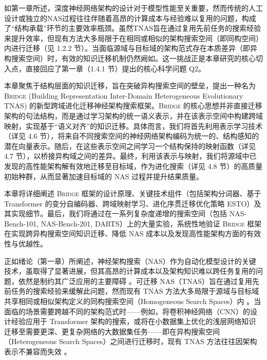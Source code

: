\documentclass[../main.tex]{subfiles}
\begin{document}


如第一章所述，深度神经网络架构的设计对于模型性能至关重要，然而传统的人工设计或独立的NAS过程往往伴随着高昂的计算成本与经验难以复用的问题，构成了“结构承载”环节的主要效率瓶颈。虽然TNAS旨在通过复用先前任务的搜索经验来提升效率，但现有方法大多局限于在相同或相似的架构搜索空间（即同构空间）内进行迁移（见 1.2.2 节）。当面临源域与目标域的架构范式存在本质差异（即异构搜索空间）时，有效的知识迁移机制仍然阙如。这一挑战正是本章研究的核心切入点，直接回应了第一章（1.4.1 节）提出的核心科学问题 Q2。

本章聚焦于结构层面的知识迁移，旨在突破异构搜索空间的壁垒，提出一种名为 \textsc{Bridge} (Building Representation Inter-Domain Heterogeneous Evolutionary TNAS) 的新型跨域进化迁移神经架构搜索框架。\textsc{Bridge} 的核心思想并非直接迁移架构的句法结构，而是通过学习架构的统一语义表示，并在该表示空间中构建跨域映射，实现基于“语义对齐”的知识迁移。具体而言，我们将首先利用表示学习技术（详见 4.6 节），将来自不同搜索空间的神经网络架构编码为统一的、结构感知的潜在向量表示。随后，在这些表示空间之间学习一个结构保持的映射函数（详见 4.7 节），以桥接异构域之间的差异。最终，利用该表示与映射，我们将源域中已发现的高性能架构解有效地迁移至目标域，作为进化搜索（详见 4.8 节）的高质量初始种群，从而显著加速目标域的 NAS 过程并提升结果质量。

本章将详细阐述 \textsc{Bridge} 框架的设计原理、关键技术组件（包括架构分词器、基于 Transformer 的变分自编码器、跨域映射学习、进化序贯迁移优化策略 ESTO）及其实现细节。最后，我们将通过在一系列复杂度递增的搜索空间（包括 NAS-Bench-101, NAS-Bench-201, DARTS）上的大量实验，系统性地验证 \textsc{Bridge} 框架在实现跨异构搜索空间知识迁移、降低 NAS 成本以及发现高性能架构方面的有效性与优越性。


正如绪论（第一章）所阐述，神经架构搜索（NAS）作为自动化模型设计的关键技术，虽取得了显著进展，但其高昂的计算成本以及架构知识难以跨任务复用的问题，依然是制约其广泛应用的主要障碍 。可迁移 NAS（TNAS）旨在通过复用先前任务的搜索经验来缓解此问题，然而现有 TNAS 方法大多局限于源域与目标域共享相同或相似架构定义的同构搜索空间（Homogeneous Search Spaces）内 。当面临的场景需要跨越不同的架构范式时——例如，将卷积神经网络（CNN）的设计经验应用于 Transformer 架构的搜索，或将在小数据集上优化的浅层网络知识迁移至需要更深、更复杂网络的大数据集任务——即在异构搜索空间（Heterogeneous Search Spaces）之间进行迁移时，现有 TNAS 方法往往因架构表示不兼容而失效 。
\end{document}
